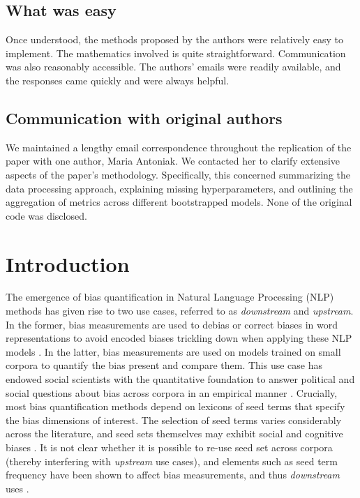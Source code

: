 \subsection*{What was easy}
Once understood, the methods proposed by the authors were relatively easy to implement. The mathematics involved is quite straightforward. Communication was also reasonably accessible. The authors' emails were readily available, and the responses came quickly and were always helpful.

\subsection*{Communication with original authors}
We maintained a lengthy email correspondence throughout the replication of the paper with one author, Maria Antoniak. We contacted her to clarify extensive aspects of the paper's methodology. Specifically, this concerned summarizing the data processing approach,  explaining missing hyperparameters, and outlining the aggregation of metrics across different bootstrapped models. None of the original code was disclosed.

\clearpage

\section{Introduction}
The emergence of bias quantification in Natural Language Processing (NLP) methods has given rise to two use cases, referred to as \emph{downstream} and \emph{upstream}. In the former, bias measurements are used to debias or correct biases in word representations to avoid encoded biases trickling down when applying these NLP models \citep{bolukbasi_man_2016, caliskan_semantics_2017}. In the latter, bias measurements are used on models trained on small corpora to quantify the bias present and compare them.
This use case has endowed social scientists with the quantitative foundation to answer political and
social questions about bias across corpora in an empirical manner
\citep{rudinger_social_2017,joseph_girls_2017}.
Crucially, most bias quantification methods depend on lexicons of seed terms that specify the bias dimensions of interest. The selection of seed terms varies considerably across the literature, and seed sets themselves may exhibit social and cognitive biases \citep{antoniak-mimno-2021-bad}. It is not clear whether it is possible to re-use seed set across corpora (thereby interfering with \emph{upstream} use cases), and elements such as seed term frequency have been shown to affect bias measurements, and thus \emph{downstream} uses \citep{ethayarajh2019understanding}.

